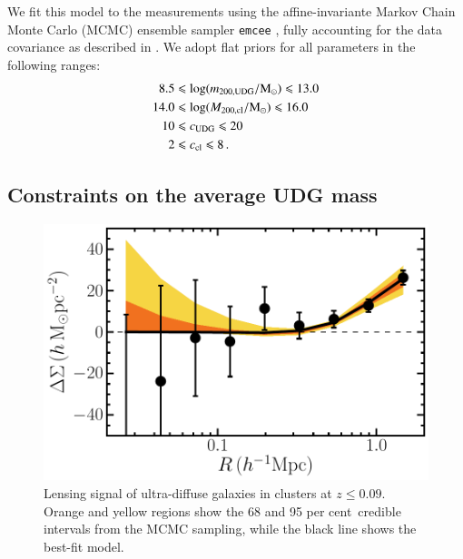 \documentclass[usenatbib,fleqn]{mnras}
\def\percent{ per cent}
\begin{document}
We fit this model to the measurements using the affine-invariante Markov Chain Monte Carlo (MCMC) ensemble sampler \texttt{emcee} \citep{foreman13}, fully accounting for the data covariance as described in \cite{sifon15_kids,sifon17}. We adopt flat priors for all parameters in the following ranges:
\begin{equation}
\begin{split}
  8.5 &\leqslant \log(m_\mathrm{200,UDG}/\mathrm{M}_\odot) \leqslant 13.0 \\
 14.0 &\leqslant \log(M_\mathrm{200,cl}/\mathrm{M}_\odot) \leqslant 16.0 \\
   10 &\leqslant c_\mathrm{UDG} \leqslant 20 \\
    2 &\leqslant c_\mathrm{cl} \leqslant 8
 \,.
\end{split}
\end{equation}



\subsection{Constraints on the average UDG mass}

\begin{figure}
 \centerline{\includegraphics[width=0.95\linewidth]{esd.pdf}}
\caption{Lensing signal of ultra-diffuse galaxies in clusters at $z\leq0.09$. Orange and yellow regions show the 68 and 95\percent\ credible intervals from the MCMC sampling, while the black line shows the best-fit model.}
\label{f:esd}
\end{figure}

\end{document}
